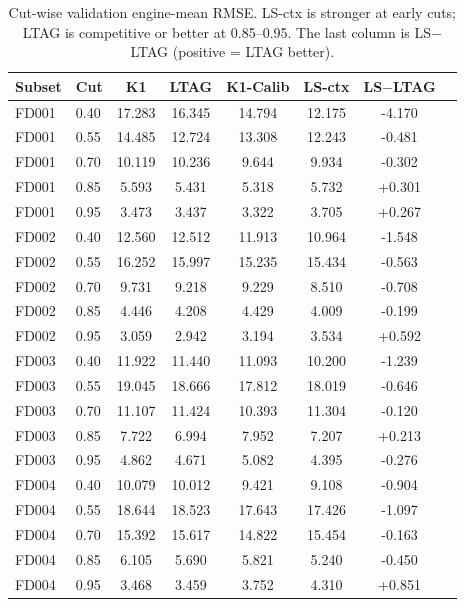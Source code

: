 \begin{table}[t]
\centering
\caption{Cut-wise validation engine-mean RMSE. LS-ctx is stronger at early cuts;
LTAG is competitive or better at 0.85--0.95. The last column is LS$-$LTAG
(positive = LTAG better).}
\label{tab:cutwise}
\small
\begin{tabular}{llcccccc}
\toprule
Subset & Cut & K1 & LTAG & K1-Calib & LS-ctx & LS$-$LTAG \\
\midrule
FD001 & 0.40 & 17.283 & 16.345 & 14.794 & 12.175 & -4.170 \\
FD001 & 0.55 & 14.485 & 12.724 & 13.308 & 12.243 & -0.481 \\
FD001 & 0.70 & 10.119 & 10.236 & 9.644 & 9.934 & -0.302 \\
FD001 & 0.85 & 5.593 & 5.431 & 5.318 & 5.732 & +0.301 \\
FD001 & 0.95 & 3.473 & 3.437 & 3.322 & 3.705 & +0.267 \\
FD002 & 0.40 & 12.560 & 12.512 & 11.913 & 10.964 & -1.548 \\
FD002 & 0.55 & 16.252 & 15.997 & 15.235 & 15.434 & -0.563 \\
FD002 & 0.70 & 9.731 & 9.218 & 9.229 & 8.510 & -0.708 \\
FD002 & 0.85 & 4.446 & 4.208 & 4.429 & 4.009 & -0.199 \\
FD002 & 0.95 & 3.059 & 2.942 & 3.194 & 3.534 & +0.592 \\
FD003 & 0.40 & 11.922 & 11.440 & 11.093 & 10.200 & -1.239 \\
FD003 & 0.55 & 19.045 & 18.666 & 17.812 & 18.019 & -0.646 \\
FD003 & 0.70 & 11.107 & 11.424 & 10.393 & 11.304 & -0.120 \\
FD003 & 0.85 & 7.722 & 6.994 & 7.952 & 7.207 & +0.213 \\
FD003 & 0.95 & 4.862 & 4.671 & 5.082 & 4.395 & -0.276 \\
FD004 & 0.40 & 10.079 & 10.012 & 9.421 & 9.108 & -0.904 \\
FD004 & 0.55 & 18.644 & 18.523 & 17.643 & 17.426 & -1.097 \\
FD004 & 0.70 & 15.392 & 15.617 & 14.822 & 15.454 & -0.163 \\
FD004 & 0.85 & 6.105 & 5.690 & 5.821 & 5.240 & -0.450 \\
FD004 & 0.95 & 3.468 & 3.459 & 3.752 & 4.310 & +0.851 \\
\bottomrule
\end{tabular}
\end{table}
